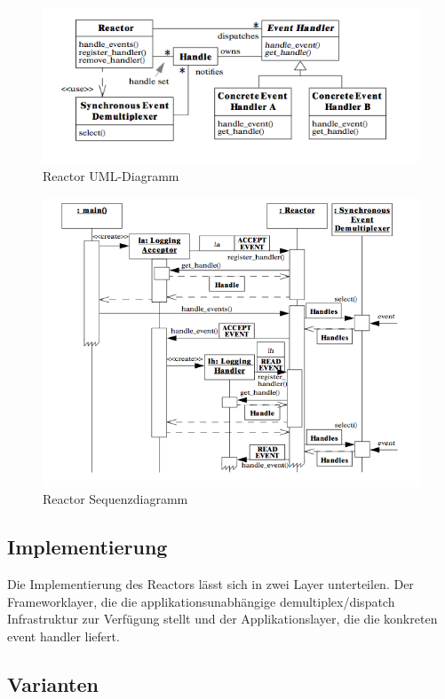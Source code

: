 \begin{figure}[H]
	\centering
	\includegraphics[width=12cm]{content/posa2/reactor/images/uml-diagram.png}
	\caption{Reactor UML-Diagramm}
\end{figure}



\begin{figure}[H]
	\centering
	\includegraphics[width=12cm]{content/posa2/reactor/images/ssd.png}
	\caption{Reactor Sequenzdiagramm}
\end{figure}


\subsection{Implementierung}

Die Implementierung des Reactors lässt sich in zwei Layer unterteilen. Der Frameworklayer, die die applikationsunabhängige demultiplex/dispatch Infrastruktur zur Verfügung stellt und der Applikationslayer, die die konkreten event handler liefert.


\subsection{Varianten}

